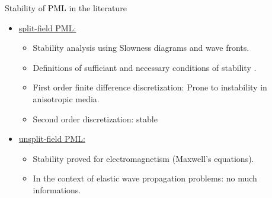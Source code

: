 \begin{frame}{Stability of PML in the literature}
\pause
    \begin{itemize}
        \item \underline{split-field PML:} 
        \begin{itemize}
        \pause
        	\item Stability analysis using Slowness diagrams and wave fronts.
        	\item Definitions of sufficiant and necessary conditions of stability \cite{Becache_elasto}. 
            \item First order finite difference discretization: Prone to instability in anisotropic media.
            \item Second order discretization: stable \cite{Duru2012}

        \end{itemize}
    \item \underline{unsplit-field PML:} 
        \begin{itemize}
        \pause
            \item Stability proved for electromagnetism (Maxwell's equations).
            \pause
            \item In the context of elastic wave propagation problems: no much informations.
        \end{itemize}
    \end{itemize}
\end{frame}

